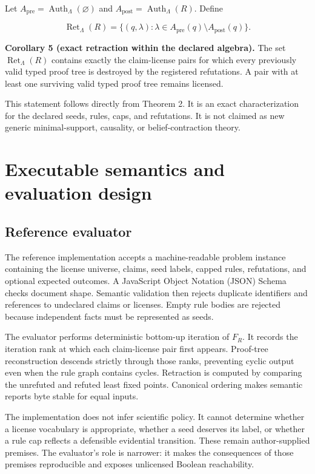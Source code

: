 \documentclass[pdflatex,sn-mathphys-num]{sn-jnl}
\begin{document}
Let \(A_{\mathrm{pre}}=\operatorname{Auth}_\Lambda(\varnothing)\) and \(A_{\mathrm{post}}=\operatorname{Auth}_\Lambda(R)\). Define

\[
\operatorname{Ret}_\Lambda(R)=
\{(q,\lambda):\lambda\in A_{\mathrm{pre}}(q)\setminus A_{\mathrm{post}}(q)\}.
\]

\textbf{Corollary 5 (exact retraction within the declared algebra).} The set \(\operatorname{Ret}_\Lambda(R)\) contains exactly the claim-license pairs for which every previously valid typed proof tree is destroyed by the registered refutations. A pair with at least one surviving valid typed proof tree remains licensed.

This statement follows directly from Theorem 2. It is an exact characterization for the declared seeds, rules, caps, and refutations. It is not claimed as new generic minimal-support, causality, or belief-contraction theory.

\section{Executable semantics and evaluation design}\label{executable-semantics-and-evaluation-design}

\subsection{Reference evaluator}\label{reference-evaluator}

The reference implementation accepts a machine-readable problem instance containing the license universe, claims, seed labels, capped rules, refutations, and optional expected outcomes. A JavaScript Object Notation (JSON) Schema checks document shape. Semantic validation then rejects duplicate identifiers and references to undeclared claims or licenses. Empty rule bodies are rejected because independent facts must be represented as seeds.

The evaluator performs deterministic bottom-up iteration of \(F_R\). It records the iteration rank at which each claim-license pair first appears. Proof-tree reconstruction descends strictly through those ranks, preventing cyclic output even when the rule graph contains cycles. Retraction is computed by comparing the unrefuted and refuted least fixed points. Canonical ordering makes semantic reports byte stable for equal inputs.

The implementation does not infer scientific policy. It cannot determine whether a license vocabulary is appropriate, whether a seed deserves its label, or whether a rule cap reflects a defensible evidential transition. These remain author-supplied premises. The evaluator's role is narrower: it makes the consequences of those premises reproducible and exposes unlicensed Boolean reachability.
\end{document}
